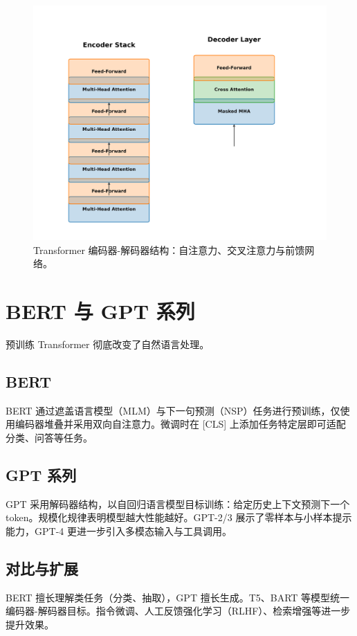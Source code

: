 ﻿\documentclass[UTF8,zihao=-4]{ctexart}
\begin{document}
\begin{figure}[H]
  \centering
  \includegraphics[width=0.85\linewidth]{transformer_layer_stack.png}
  \caption{Transformer 编码器-解码器结构：自注意力、交叉注意力与前馈网络。}
  \label{fig:transformer_stack_cn}
\end{figure}
\FloatBarrier

\section{BERT 与 GPT 系列}
预训练 Transformer 彻底改变了自然语言处理。

\subsection{BERT}
BERT 通过遮盖语言模型（MLM）与下一句预测（NSP）任务进行预训练，仅使用编码器堆叠并采用双向自注意力。微调时在 [CLS] 上添加任务特定层即可适配分类、问答等任务。

\subsection{GPT 系列}
GPT 采用解码器结构，以自回归语言模型目标训练：给定历史上下文预测下一个 token。规模化规律表明模型越大性能越好。GPT-2/3 展示了零样本与小样本提示能力，GPT-4 更进一步引入多模态输入与工具调用。

\subsection{对比与扩展}
BERT 擅长理解类任务（分类、抽取），GPT 擅长生成。T5、BART 等模型统一编码器-解码器目标。指令微调、人工反馈强化学习（RLHF）、检索增强等进一步提升效果。
\end{document}

